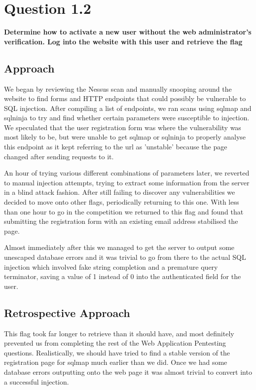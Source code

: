 \section{Question 1.2}
\textbf{Determine how to activate a new user without the web administrator's
verification. Log into the website with this user and retrieve the flag}
\subsection{Approach}
We began by reviewing the Nessus scan and manually snooping around the website
to find forms and HTTP endpoints that could possibly be vulnerable to SQL
injection. After compiling a list of endpoints, we ran scans using sqlmap and
sqlninja to try and find whether certain parameters were susceptible to
injection. We speculated that the user registration form was where the
vulnerability was most likely to be, but were unable to get sqlmap or sqlninja
to properly analyse this endpoint as it kept referring to the url as 'unstable'
because the page changed after sending requests to it.

An hour of trying various different combinations of parameters later, we
reverted to manual injection attempts, trying to extract some information from
the server in a blind attack fashion. After still failing to discover any
vulnerabilities we decided to move onto other flags, periodically returning to
this one. With less than one hour to go in the competition we returned to this
flag and found that submitting the registration form with an existing email
address stabilised the page.

Almost immediately after this we managed to get the server to output some
unescaped database errors and it was trivial to go from there to the actual SQL
injection which involved fake string completion and a premature query
terminator, saving a value of 1 instead of 0 into the authenticated field for
the user.
\subsection{Retrospective Approach}
This flag took far longer to retrieve than it should have, and most definitely
prevented us from completing the rest of the Web Application Pentesting
questions. Realistically, we should have tried to find a stable version of the
registration page for sqlmap much earlier than we did. Once we had some database
errors outputting onto the web page it was almost trivial to convert into a
successful injection.

